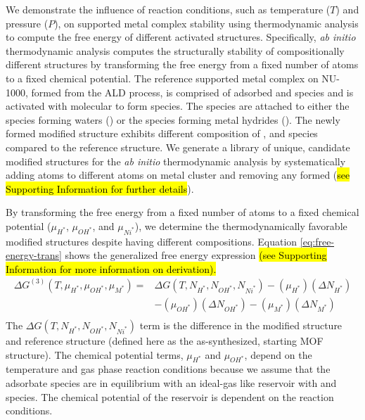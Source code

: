\documentclass[journal=jctcce,manuscript=article]{achemso}
\begin{document}
We demonstrate the influence of reaction conditions, such as temperature ($T$) and pressure ($P$), on supported metal complex stability using thermodynamic analysis to compute the free energy of different activated structures. Specifically, \textit{ab initio} thermodynamic analysis computes the structurally stability of compositionally different structures by transforming the free energy from a fixed number of atoms to a fixed chemical potential. The reference supported metal complex on NU-1000, formed from the ALD process, is comprised of adsorbed  and  species and is activated with molecular  to form  species. The  species are attached to either the  species forming waters () or the  species forming metal hydrides (). The newly formed modified structure exhibits different composition of ,  and  species compared to the reference structure. We generate a library of unique, candidate modified structures for the \textit{ab initio} thermodynamic analysis by systematically adding  atoms to different atoms on metal cluster and removing any formed  (\hl{see Supporting Information for further details}).

By transforming the free energy from a fixed number of atoms to a fixed chemical potential ($\mu_{H^{*}}$, $\mu_{OH^{*}}$, and $\mu_{Ni^{*}}$), we determine the thermodynamically favorable modified structures despite having different compositions. Equation \ref{eq:free-energy-trans} shows the generalized free energy expression \hl{(see Supporting Information for more information on derivation).}
\begin{equation}
    \begin{split}
        \Delta G^{(3)}(T,\mu_{H^{*}},\mu_{OH^{*}},\mu_{M^{*}})  = & \Delta G(T,N_{H^{*}},N_{OH^{*}},N_{Ni^{*}}) - (\mu_{H^{*}})(\Delta N_{H^{*}}) \\
        & - (\mu_{OH^{*}})(\Delta N_{OH^{*}}) 
          - (\mu_{M^{*}})(\Delta N_{M^{*}}) \\ 
    \end{split}
    \label{eq:free-energy-trans}
\end{equation}
The $\Delta G(T,N_{H^{*}},N_{OH^{*}},N_{Ni^{*}})$ term is the difference in the modified structure and reference structure (defined here as the as-synthesized, starting MOF structure). The chemical potential terms,  $\mu_{H^{*}}$ and $\mu_{OH^{*}}$, depend on the temperature and gas phase reaction conditions because we assume that the adsorbate species are in equilibrium with an ideal-gas like reservoir with  and  species. The chemical potential of the reservoir is dependent on the reaction conditions. 
\end{document}

